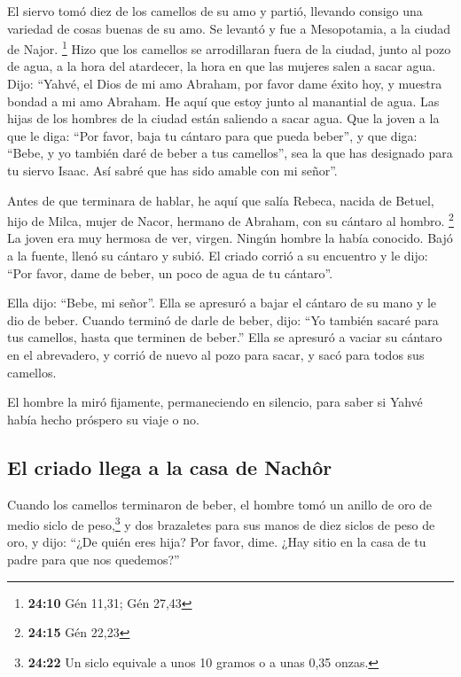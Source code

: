  El siervo tomó diez de los camellos de su amo y partió,
llevando consigo una variedad de cosas buenas de su amo. Se levantó y
fue a Mesopotamia, a la ciudad de Najor. \footnote{\textbf{24:10} Gén
  11,31; Gén 27,43}  Hizo que los camellos se
arrodillaran fuera de la ciudad, junto al pozo de agua, a la hora del
atardecer, la hora en que las mujeres salen a sacar agua.
 Dijo: ``Yahvé, el Dios de mi amo Abraham, por favor dame
éxito hoy, y muestra bondad a mi amo Abraham.  He aquí
que estoy junto al manantial de agua. Las hijas de los hombres de la
ciudad están saliendo a sacar agua.  Que la joven a la
que le diga: ``Por favor, baja tu cántaro para que pueda beber'', y que
diga: ``Bebe, y yo también daré de beber a tus camellos'', sea la que
has designado para tu siervo Isaac. Así sabré que has sido amable con mi
señor''.

 Antes de que terminara de hablar, he aquí que salía
Rebeca, nacida de Betuel, hijo de Milca, mujer de Nacor, hermano de
Abraham, con su cántaro al hombro. \footnote{\textbf{24:15} Gén 22,23}
 La joven era muy hermosa de ver, virgen. Ningún hombre
la había conocido. Bajó a la fuente, llenó su cántaro y subió.
 El criado corrió a su encuentro y le dijo: ``Por favor,
dame de beber, un poco de agua de tu cántaro''.

 Ella dijo: ``Bebe, mi señor''. Ella se apresuró a bajar
el cántaro de su mano y le dio de beber.  Cuando terminó
de darle de beber, dijo: ``Yo también sacaré para tus camellos, hasta
que terminen de beber.''  Ella se apresuró a vaciar su
cántaro en el abrevadero, y corrió de nuevo al pozo para sacar, y sacó
para todos sus camellos.

 El hombre la miró fijamente, permaneciendo en silencio,
para saber si Yahvé había hecho próspero su viaje o no.

\hypertarget{el-criado-llega-a-la-casa-de-nachuxf4r}{%
\subsection{El criado llega a la casa de
Nachôr}\label{el-criado-llega-a-la-casa-de-nachuxf4r}}

 Cuando los camellos terminaron de beber, el hombre tomó
un anillo de oro de medio siclo de peso,\footnote{\textbf{24:22} Un
  siclo equivale a unos 10 gramos o a unas 0,35 onzas.} y dos brazaletes
para sus manos de diez siclos de peso de oro,  y dijo:
``¿De quién eres hija? Por favor, dime. ¿Hay sitio en la casa de tu
padre para que nos quedemos?''

